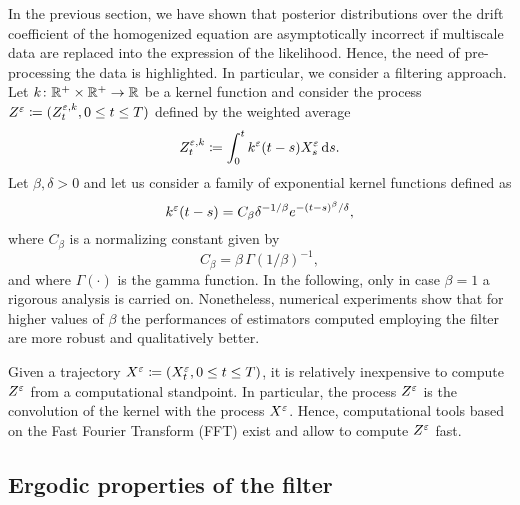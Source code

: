 \documentclass[10pt]{article}
\begin{document}
In the previous section, we have shown that posterior distributions over the drift coefficient of the homogenized equation are asymptotically incorrect if multiscale data are replaced into the expression of the likelihood. Hence, the need of pre-processing the data is highlighted. In particular, we consider a filtering approach. Let $k \colon \mathbb{R}^+ \times \mathbb{R}^+ \to \mathbb{R}$ be a kernel function and consider the process $Z^\varepsilon \coloneqq (Z^{\varepsilon,k}_t, 0 \leq t \leq T)$ defined by the weighted average
\begin{equation}\label{eq:ZDef}
	Z^{\varepsilon,k}_t \coloneqq \int_0^t k^\varepsilon(t-s)X^\varepsilon_s \,\mathrm{d} s.
\end{equation}
Let $\beta, \delta > 0$ and let us consider a family of exponential kernel functions defined as
\begin{equation}
	k^\varepsilon(t-s) = C_\beta \delta^{-1/\beta} e^{-(t-s)^\beta/\delta},
\end{equation}
where $C_{\beta}$ is a normalizing constant given by
\begin{equation}
	C_\beta = \beta \, \Gamma(1/\beta)^{-1},
\end{equation}
and where $\Gamma(\cdot)$ is the gamma function. In the following, only in case $\beta = 1$ a rigorous analysis is carried on. Nonetheless, numerical experiments show that for higher values of $\beta$ the performances of estimators computed employing the filter are more robust and qualitatively better. 

Given a trajectory $X^\varepsilon \coloneqq (X^\varepsilon_t, 0\leq t \leq T)$, it is relatively inexpensive to compute $Z^\varepsilon$ from a computational standpoint. In particular, the process $Z^\varepsilon$ is the convolution of the kernel with the process $X^\varepsilon$. Hence, computational tools based on the Fast Fourier Transform (FFT) exist and allow to compute $Z^\varepsilon$ fast.

\subsection{Ergodic properties of the filter}\label{sec:ergodic}
\end{document}
